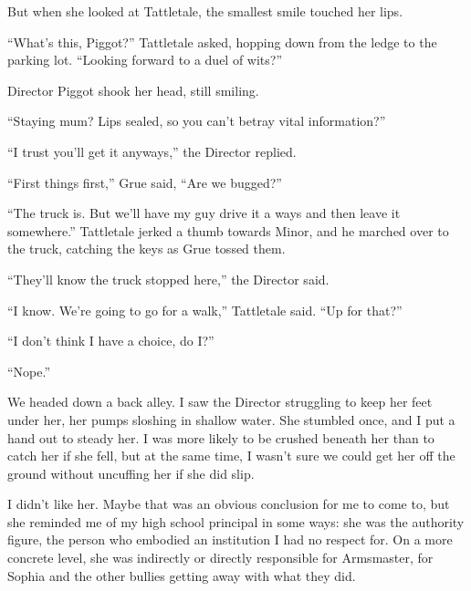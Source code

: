 But when she looked at Tattletale, the smallest smile touched her lips.



``What's this, Piggot?'' Tattletale asked, hopping down from the ledge to the parking lot.  ``Looking forward to a duel of wits?''



Director Piggot shook her head, still smiling.



``Staying mum?  Lips sealed, so you can't betray vital information?''



``I trust you'll get it anyways,'' the Director replied.



``First things first,'' Grue said, ``Are we bugged?''



``The truck is.  But we'll have my guy drive it a ways and then leave it somewhere.''  Tattletale jerked a thumb towards Minor, and he marched over to the truck, catching the keys as Grue tossed them.



``They'll know the truck stopped here,'' the Director said.



``I know.  We're going to go for a walk,'' Tattletale said.  ``Up for that?''



``I don't think I have a choice, do I?''



``Nope.''



We headed down a back alley.  I saw the Director struggling to keep her feet under her, her pumps sloshing in shallow water.  She stumbled once, and I put a hand out to steady her.  I was more likely to be crushed beneath her than to catch her if she fell, but at the same time, I wasn't sure we could get her off the ground without uncuffing her if she did slip.



I didn't like her.  Maybe that was an obvious conclusion for me to come to, but she reminded me of my high school principal in some ways: she was the authority figure, the person who embodied an institution I had no respect for.  On a more concrete level, she was indirectly or directly responsible for Armsmaster, for Sophia and the other bullies getting away with what they did.



